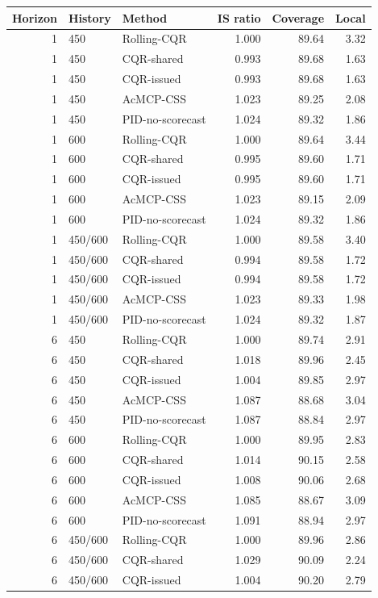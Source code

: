 \begin{tabular}{rllrrr}
\toprule
Horizon & History & Method & IS ratio & Coverage & Local \\
\midrule
1 & 450 & Rolling-CQR & 1.000 & 89.64 & 3.32 \\
1 & 450 & CQR-shared & 0.993 & 89.68 & 1.63 \\
1 & 450 & CQR-issued & 0.993 & 89.68 & 1.63 \\
1 & 450 & AcMCP-CSS & 1.023 & 89.25 & 2.08 \\
1 & 450 & PID-no-scorecast & 1.024 & 89.32 & 1.86 \\
1 & 600 & Rolling-CQR & 1.000 & 89.64 & 3.44 \\
1 & 600 & CQR-shared & 0.995 & 89.60 & 1.71 \\
1 & 600 & CQR-issued & 0.995 & 89.60 & 1.71 \\
1 & 600 & AcMCP-CSS & 1.023 & 89.15 & 2.09 \\
1 & 600 & PID-no-scorecast & 1.024 & 89.32 & 1.86 \\
1 & 450/600 & Rolling-CQR & 1.000 & 89.58 & 3.40 \\
1 & 450/600 & CQR-shared & 0.994 & 89.58 & 1.72 \\
1 & 450/600 & CQR-issued & 0.994 & 89.58 & 1.72 \\
1 & 450/600 & AcMCP-CSS & 1.023 & 89.33 & 1.98 \\
1 & 450/600 & PID-no-scorecast & 1.024 & 89.32 & 1.87 \\
6 & 450 & Rolling-CQR & 1.000 & 89.74 & 2.91 \\
6 & 450 & CQR-shared & 1.018 & 89.96 & 2.45 \\
6 & 450 & CQR-issued & 1.004 & 89.85 & 2.97 \\
6 & 450 & AcMCP-CSS & 1.087 & 88.68 & 3.04 \\
6 & 450 & PID-no-scorecast & 1.087 & 88.84 & 2.97 \\
6 & 600 & Rolling-CQR & 1.000 & 89.95 & 2.83 \\
6 & 600 & CQR-shared & 1.014 & 90.15 & 2.58 \\
6 & 600 & CQR-issued & 1.008 & 90.06 & 2.68 \\
6 & 600 & AcMCP-CSS & 1.085 & 88.67 & 3.09 \\
6 & 600 & PID-no-scorecast & 1.091 & 88.94 & 2.97 \\
6 & 450/600 & Rolling-CQR & 1.000 & 89.96 & 2.86 \\
6 & 450/600 & CQR-shared & 1.029 & 90.09 & 2.24 \\
6 & 450/600 & CQR-issued & 1.004 & 90.20 & 2.79 \\

\end{tabular}
